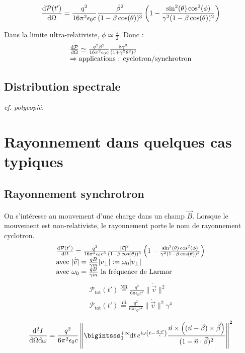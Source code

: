 \begin{minipage}{0.65\linewidth}
	$$
		\frac{\mathrm{d}\mathcal{P}(t')}{\mathrm{d}\Omega}=\frac{q^2}{16\pi^2\epsilon_0c}\frac{\dot{\beta}^2}{(1-\beta\cos(\theta))^3}\left(1-\frac{\sin^2(\theta)\cos^2(\phi)}{\gamma^2(1-\beta\cos(\theta))^2}\right)
	$$
	
	Dans la limite ultra-relativiste, $\phi\simeq\frac{\pi}{2}$. Donc :
	$$
		\begin{array}{l}
			\frac{\mathrm{d}\mathcal{P}}{\mathrm{d}\Omega}\simeq\frac{q^2\dot{\beta}^2}{16\pi^2\epsilon_0c}
			\frac{8\gamma^3}{(1+\gamma^2\theta^2)^3}\\
			\Rightarrow \text{applications : cyclotron/synchrotron}
		\end{array}
	$$
\end{minipage}



\subsection{Distribution spectrale}
\emph{cf. polycopié.}

\section{Rayonnement dans quelques cas typiques}
\subsection{Rayonnement synchrotron}
On s'intéresse au mouvement d'une charge dans un champ $\vec{B}$. Lorsque le mouvement est non-relativiste, le rayonnement porte le nom de rayonnement cyclotron.
$$
	\begin{array}{l}
		\frac{\mathrm{d}\mathcal{P}(t')}{\mathrm{d}\Omega}=\frac{q^2}{16\pi^2\epsilon_0c^3}
			\frac{|\dot{\vec{v}}|^2}{(1-\beta\cos(\theta))^3}
			\left(1-\frac{\sin^2(\theta)\cos^2(\phi)}{\gamma^2(1-\beta\cos(\theta))^2}\right)\\
		\text{avec }|\dot{\vec{v}}|=\frac{qB}{\gamma m}|v_{\perp}|\vcentcolon=\omega_0|v_{\perp}|\\
		\text{avec }\omega_0=\frac{qB}{\gamma m}\text{ la fréquence de Larmor}
	\end{array}
$$
$$
	\begin{array}{l}
		\mathcal{P}_\text{tot}(t')\overset{\text{NR}}{=}\frac{q^2}{6\pi\epsilon_0c^2}\|\dot{\vec{v}}\|^2\\
		\mathcal{P}_\text{tot}(t')\overset{\text{uR}}{=}\frac{q^2}{6\pi\epsilon_0c^2}\|\dot{\vec{v}}\|^2\gamma^4
	\end{array}
$$

$$
	\frac{\dif^2I}{\dif\Omega\dif\omega}=\frac{q^2}{6\pi^2\epsilon_0c}\left\|\bigintsss_0^{+\infty}\!
		\dif t\, e^{i\omega\left(t-\frac{\vec{n}\cdot\vec{r}}{c}\right)}
		\frac{\vec{n}\times\left((\vec{n}-\vec{\beta})\times\dot{\vec{\beta}}\right)}{(1-\vec{n}\cdot\vec{\beta})^2}
		\right\|^2
$$
